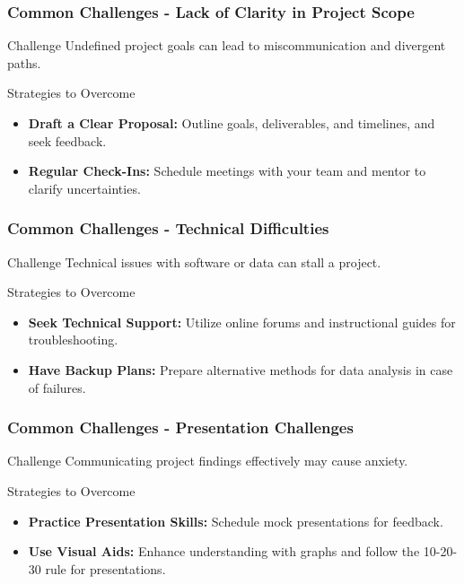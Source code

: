 \documentclass[aspectratio=169]{beamer}
\begin{document}
\begin{frame}[fragile]
    \frametitle{Common Challenges - Lack of Clarity in Project Scope}
    \begin{block}{Challenge}
        Undefined project goals can lead to miscommunication and divergent paths.
    \end{block}
    \begin{block}{Strategies to Overcome}
        \begin{itemize}
            \item \textbf{Draft a Clear Proposal:} Outline goals, deliverables, and timelines, and seek feedback.
            \item \textbf{Regular Check-Ins:} Schedule meetings with your team and mentor to clarify uncertainties.
        \end{itemize}
    \end{block}
\end{frame}

\begin{frame}[fragile]
    \frametitle{Common Challenges - Technical Difficulties}
    \begin{block}{Challenge}
        Technical issues with software or data can stall a project.
    \end{block}
    \begin{block}{Strategies to Overcome}
        \begin{itemize}
            \item \textbf{Seek Technical Support:} Utilize online forums and instructional guides for troubleshooting.
            \item \textbf{Have Backup Plans:} Prepare alternative methods for data analysis in case of failures.
        \end{itemize}
    \end{block}
\end{frame}

\begin{frame}[fragile]
    \frametitle{Common Challenges - Presentation Challenges}
    \begin{block}{Challenge}
        Communicating project findings effectively may cause anxiety.
    \end{block}
    \begin{block}{Strategies to Overcome}
        \begin{itemize}
            \item \textbf{Practice Presentation Skills:} Schedule mock presentations for feedback.
            \item \textbf{Use Visual Aids:} Enhance understanding with graphs and follow the 10-20-30 rule for presentations.
        \end{itemize}
    \end{block}
\end{frame}
\end{document}
